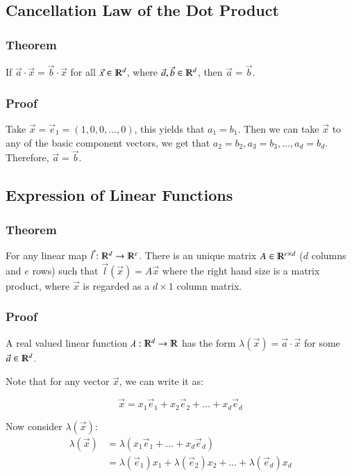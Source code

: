 \documentclass [12 pt, twoside] {book}
\newcommand\+{\text{ }}
\begin{document}
\subsection{Cancellation Law of the Dot Product}
\subsubsection{Theorem}

If $\vec{a} \cdot \vec{x} = \vec{b} \cdot \vec{x}$ for all $\vec{x} \in
\varmathbb{R}^d$, where $\vec{a}, \vec{b} \in \varmathbb{R}^d$, then $\vec{a} =
\vec{b}$.

\subsubsection{Proof}

Take $\vec{x} = \vec{e}_1 = (1, 0, 0, \dots, 0)$, this yields that $a_1 = b_1$.
Then we can take $\vec{x}$ to any of the basic component vectors, we get that
$a_2 = b_2, a_3 = b_3, \dots, a_d = b_d$. Therefore, $\vec{a} = \vec{b}$.

\subsection{Expression of Linear Functions}
\subsubsection{Theorem}
For any linear map $\vec{l}: \varmathbb{R}^d \to \varmathbb{R}^e$.
There is an unique matrix $A \in \varmathbb{R}^{e \times d}$ ($d$ columns and
$e$ rows) such that $\vec{l}(\vec{x}) = A\vec{x}$ where the right hand size is a
matrix product, where $\vec{x}$ is regarded as a $d \times 1$ column matrix.

\subsubsection{Proof}
A real valued linear function $\lambda : \varmathbb{R}^d \to \varmathbb{R}$ has
the form $\lambda(\vec{x}) = \vec{a} \cdot \vec{x}$ for some $\vec{a} \in
\varmathbb{R}^d$.

Note that for any vector $\vec{x}$, we can write it as:

\[
    \vec{x} = x_1\vec{e}_1 + x_2\vec{e}_2 + \dots + x_d\vec{e}_d
\]

Now consider $\lambda(\vec{x})$:
\begin{align*}
    \lambda(\vec{x}) &= \lambda(x_1 \vec{e}_1 + \dots + x_d \vec{e}_d)\\
                     &= \lambda(\vec{e}_1) x_1 + \lambda(\vec{e}_2) x_2 + \dots
    + \lambda(\vec{e}_d)x_d
\end{align*}
\end{document}
